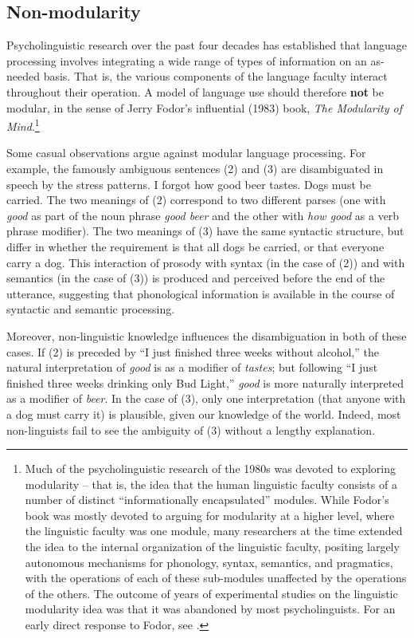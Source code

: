 \documentclass[a4paper]{article}
\begin{document}
\subsection{Non-modularity}

Psycholinguistic research over the past four decades has established that language processing
involves integrating a wide range of types of information on an as-needed basis.  That is, the
various components of the language faculty interact throughout their operation.  A model of language
use should therefore {\bf not} be modular, in the sense of Jerry Fodor's influential (1983) book,
{\it The Modularity of Mind}.\footnote{%
  Much of the psycholinguistic research of the 1980s was devoted to exploring modularity -- that is, the idea that the human linguistic faculty consists of a number of distinct ``informationally encapsulated'' modules.  While Fodor's book was mostly devoted to arguing for modularity at a higher level, where the linguistic faculty was one module, many researchers at the time extended the idea to the internal organization of the linguistic faculty, positing largely autonomous mechanisms for phonology, syntax, semantics, and pragmatics, with the operations of each of these sub-modules unaffected by the operations of the others. The outcome of years of experimental studies on the linguistic modularity idea was that it was abandoned by most psycholinguists. For an early direct response to Fodor, see \citet{MarslenTyler87}.}

Some casual observations argue against modular language processing.  For example, the famously ambiguous sentences (2) and (3) are disambiguated in speech by the stress patterns.
\eal
\ex I forgot how good beer tastes.
\ex Dogs must be carried.
\zl
The two meanings of (2) correspond to two different parses (one with {\it good} as part of the noun phrase {\it good beer} and the other with {\it how good} as a verb phrase modifier).  The two meanings of (3) have the same syntactic structure, but differ in whether the requirement is that all dogs be carried, or that everyone carry a dog.  This interaction of prosody with syntax (in the case of (2)) and with semantics (in the case of (3)) is produced and perceived before the end of the utterance, suggesting that phonological information is available in the course of syntactic and semantic processing.  

Moreover, non-linguistic knowledge influences the disambiguation in both of these cases.  If (2) is preceded by ``I just finished three weeks without alcohol,'' the natural interpretation of {\it good} is as a modifier of {\it tastes}; but following ``I just finished three weeks drinking only Bud Light,'' {\it good} is more naturally interpreted as a modifier of {\it beer}.  In the case of (3), only one interpretation (that anyone with a dog must carry it) is plausible, given our knowledge of the world.  Indeed, most non-linguists fail to see the ambiguity of (3) without a lengthy explanation.  
\end{document}
